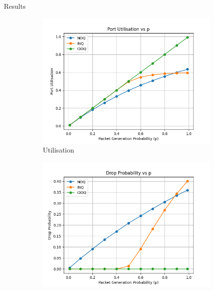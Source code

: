 \begin{section}{Results}

    \begin{figure}[htbp]
        \centering
        \begin{subfigure}[b]{0.45\textwidth}
            \centering
            \includegraphics[width=\textwidth]{figures/fig1/fig1a.png}
            \caption{Utilisation}
            \label{fig:utilisation}
        \end{subfigure}
        \hfill
        \begin{subfigure}[b]{0.45\textwidth}
            \centering
            \includegraphics[width=\textwidth]{figures/fig1/fig1b.png}

\end{subfigure}
\end{figure}
\end{section}

